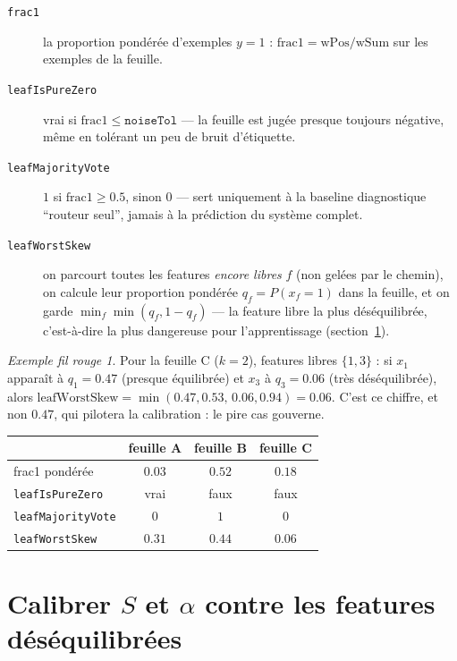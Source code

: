 \documentclass[12pt,a4paper]{article}
\newcommand{\code}[1]{\texttt{#1}}
\theoremstyle{remark}
\newtheorem{exemple}{Exemple fil rouge}[section]
\begin{document}
\begin{description}
  \item[\code{frac1}] la proportion pondérée d'exemples $y{=}1$ :
    $\mathrm{frac1} = \mathrm{wPos}/\mathrm{wSum}$ sur les exemples de la feuille.
  \item[\code{leafIsPureZero}] vrai si $\mathrm{frac1} \le \code{noiseTol}$ ---
    la feuille est jugée presque toujours négative, même en tolérant un peu de
    bruit d'étiquette.
  \item[\code{leafMajorityVote}] $1$ si $\mathrm{frac1}\ge0.5$, sinon $0$ ---
    sert uniquement à la baseline diagnostique ``routeur seul'', jamais à la
    prédiction du système complet.
  \item[\code{leafWorstSkew}] on parcourt toutes les features \emph{encore
    libres} $f$ (non gelées par le chemin), on calcule leur proportion pondérée
    $q_f = P(x_f{=}1)$ dans la feuille, et on garde
    $\min_f \min(q_f, 1-q_f)$ --- la feature libre la plus déséquilibrée,
    c'est-à-dire la plus dangereuse pour l'apprentissage (section~\ref{sec:calib}).
\end{description}

\begin{exemple}
Pour la feuille C ($k{=}2$), features libres $\{1,3\}$ : si $x_1$ apparaît à
$q_1=0.47$ (presque équilibrée) et $x_3$ à $q_3=0.06$ (très déséquilibrée), alors
$\mathrm{leafWorstSkew} = \min(0.47,0.53,\,0.06,0.94) = 0.06$. C'est ce chiffre,
et non $0.47$, qui pilotera la calibration : le pire cas gouverne.
\end{exemple}

\begin{center}
\renewcommand{\arraystretch}{1.3}
\begin{tabular}{lccc}
\toprule
 & \textbf{feuille A} & \textbf{feuille B} & \textbf{feuille C} \\
\midrule
frac1 pondérée         & $0.03$ & $0.52$ & $0.18$ \\
\code{leafIsPureZero}  & vrai   & faux   & faux   \\
\code{leafMajorityVote}& $0$    & $1$    & $0$    \\
\code{leafWorstSkew}   & $0.31$ & $0.44$ & $0.06$ \\
\bottomrule
\end{tabular}
\end{center}

\section{Calibrer $S$ et $\alpha$ contre les features déséquilibrées}\label{sec:calib}
\end{document}
